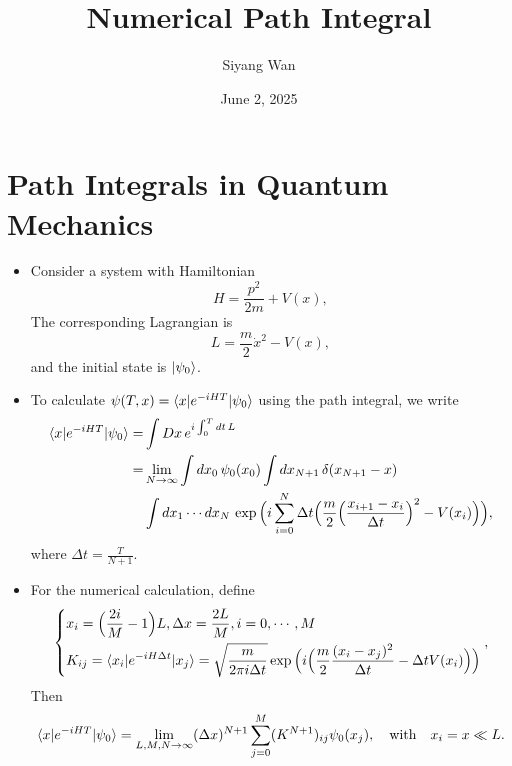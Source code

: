 \documentclass[10pt, a4paper]{article}
\title{\Huge \textbf{Numerical Path Integral}}
\author{Siyang Wan}
\date{June 2, 2025}
\numberwithin{equation}{section}
\begin{document}
	\maketitle
	
	\tableofcontents
	
	\section{Path Integrals in Quantum Mechanics}
	\begin{itemize}
		\item Consider a system with Hamiltonian
		\begin{equation}
			H = \frac{p^2}{2 m} + V(x),
		\end{equation}
		The corresponding Lagrangian is
		\begin{equation}
			L = \frac{m}{2} \dot{x}^2 - V(x),
		\end{equation}
		and the initial state is $\ket{\psi_0}$.
		
		\item To calculate $\psi(T, x) = \braket{x | e^{- i H T} | \psi_0}$ using the path integral, we write
		\begin{align}
			\braket{x | e^{- i H T} | \psi_0} =& \int Dx \, e^{i \int_0^T dt \, L} \notag \\
			=& \lim_{N \rightarrow \infty} \int dx_0 \, \psi_0(x_0) \int dx_{N + 1} \, \delta(x_{N + 1} - x) \notag \\
			& \int dx_1 \cdots dx_N \, \exp \Big( i \sum_{i = 0}^N \Delta t \Big( \frac{m}{2} \Big( \frac{x_{i + 1} - x_i}{\Delta t} \Big)^2 - V(x_i) \Big) \Big),
		\end{align}
		where $\Delta t = \frac{T}{N + 1}$.
		
		\item For the numerical calculation, define
		\begin{equation}
			\begin{dcases}
				x_i = \Big( \frac{2 i}{M} - 1 \Big) L, \Delta x = \frac{2 L}{M}, i = 0, \cdots, M \\
				K_{i j} = \braket{x_i | e^{- i H \Delta t} | x_j} = \sqrt{\frac{m}{2 \pi i \Delta t}} \exp \Big( i \Big( \frac{m}{2} \frac{(x_i - x_j)^2}{\Delta t} - \Delta t V(x_i) \Big) \Big)
			\end{dcases},
		\end{equation}
		Then
		\begin{equation} \label{1.5}
			\braket{x | e^{- i H T} | \psi_0} = \lim_{L, M, N \rightarrow \infty} (\Delta x)^{N + 1} \sum_{j = 0}^M (K^{N + 1})_{i j} \psi_0(x_j), \quad \text{with} \quad x_i = x \ll L.
		\end{equation}
	\end{itemize}
	
\end{document}
